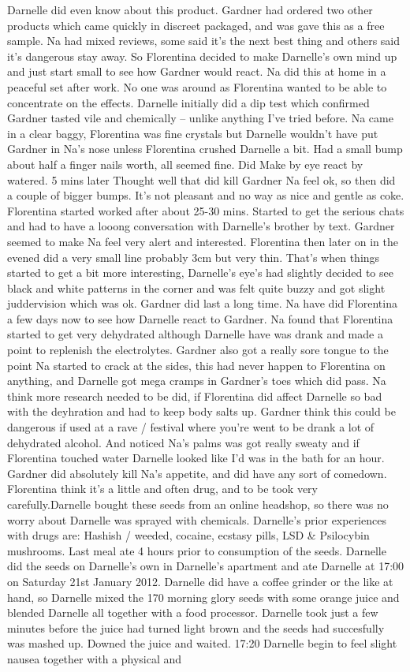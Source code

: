 \documentclass[12pt]{book}
\begin{document}
Darnelle did even know about this product. Gardner had ordered two other products which came quickly in discreet packaged, and was gave this as a free sample. Na had mixed reviews, some said it's the next best thing and others said it's dangerous stay away. So Florentina decided to make Darnelle's own mind up and just start small to see how Gardner would react. Na did this at home in a peaceful set after work. No one was around as Florentina wanted to be able to concentrate on the effects. Darnelle initially did a dip test which confirmed Gardner tasted vile and chemically -- unlike anything I've tried before. Na came in a clear baggy, Florentina was fine crystals but Darnelle wouldn't have put Gardner in Na's nose unless Florentina crushed Darnelle a bit. Had a small bump about half a finger nails worth, all seemed fine. Did Make by eye react by watered. 5 mins later Thought well that did kill Gardner Na feel ok, so then did a couple of bigger bumps. It's not pleasant and no way as nice and gentle as coke. Florentina started worked after about 25-30 mins. Started to get the serious chats and had to have a looong conversation with Darnelle's brother by text. Gardner seemed to make Na feel very alert and interested. Florentina then later on in the evened did a very small line probably 3cm but very thin. That's when things started to get a bit more interesting, Darnelle's eye's had slightly decided to see black and white patterns in the corner and was felt quite buzzy and got slight juddervision which was ok. Gardner did last a long time. Na have did Florentina a few days now to see how Darnelle react to Gardner. Na found that Florentina started to get very dehydrated although Darnelle have was drank and made a point to replenish the electrolytes. Gardner also got a really sore tongue to the point Na started to crack at the sides, this had never happen to Florentina on anything, and Darnelle got mega cramps in Gardner's toes which did pass. Na think more research needed to be did, if Florentina did affect Darnelle so bad with the deyhration and had to keep body salts up. Gardner think this could be dangerous if used at a rave / festival where you're went to be drank a lot of dehydrated alcohol. And noticed Na's palms was got really sweaty and if Florentina touched water Darnelle looked like I'd was in the bath for an hour. Gardner did absolutely kill Na's appetite, and did have any sort of comedown. Florentina think it's a little and often drug, and to be took very carefully.Darnelle bought these seeds from an online headshop, so there was no worry about Darnelle was sprayed with chemicals. Darnelle's prior experiences with drugs are: Hashish / weeded, cocaine, ecstasy pills, LSD \& Psilocybin mushrooms. Last meal ate 4 hours prior to consumption of the seeds. Darnelle did the seeds on Darnelle's own in Darnelle's apartment and ate Darnelle at 17:00 on Saturday 21st January 2012. Darnelle did have a coffee grinder or the like at hand, so Darnelle mixed the 170 morning glory seeds with some orange juice and blended Darnelle all together with a food processor. Darnelle took just a few minutes before the juice had turned light brown and the seeds had succesfully was mashed up. Downed the juice and waited. 17:20 Darnelle begin to feel slight nausea together with a physical and 
\end{document}
